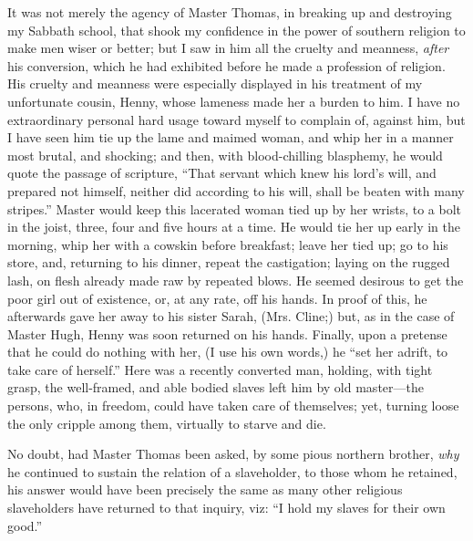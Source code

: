 It was not merely the agency of Master Thomas, in breaking up and
destroying my Sabbath school, that shook my confidence in the power of
southern religion to make men wiser or better; but I saw in him all the
cruelty and meanness, \emph{after} his conversion,
{\protect\hypertarget{201}{}{}}which he had exhibited before he made a
profession of religion. His cruelty and meanness were especially
displayed in his treatment of my unfortunate cousin, Henny, whose
lameness made her a burden to him. I have no extraordinary personal hard
usage toward myself to complain of, against him, but I have seen him tie
up the lame and maimed woman, and whip her in a manner most brutal, and
shocking; and then, with blood-chilling blasphemy, he would quote the
passage of scripture, ``That servant which knew his lord's will, and
prepared not himself, neither did according to his will, shall be beaten
with many stripes.'' Master would keep this lacerated woman tied up by
her wrists, to a bolt in the joist, three, four and five hours at a
time. He would tie her up early in the morning, whip her with a cowskin
before breakfast; leave her tied up; go to his store, and, returning to
his dinner, repeat the castigation; laying on the rugged lash, on flesh
already made raw by repeated blows. He seemed desirous to get the poor
girl out of existence, or, at any rate, off his hands. In proof of this,
he afterwards gave her away to his sister Sarah, (Mrs. Cline;) but, as
in the case of Master Hugh, Henny was soon returned on his hands.
Finally, upon a pretense that he could do nothing with her, (I use his
own words,) he ``set her adrift, to take care of herself.'' Here was a
recently converted man, holding, with tight grasp, the well-framed, and
able bodied slaves left him by old master---the persons, who, in
freedom, could have taken care of themselves; yet, turning loose the
only cripple among them, virtually to starve and die.

{\protect\hypertarget{202}{}{}}No doubt, had Master Thomas been asked,
by some pious northern brother, \emph{why} he continued to sustain the
relation of a slaveholder, to those whom he retained, his answer would
have been precisely the same as many other religious slaveholders have
returned to that inquiry, viz: ``I hold my slaves for their own good.''


